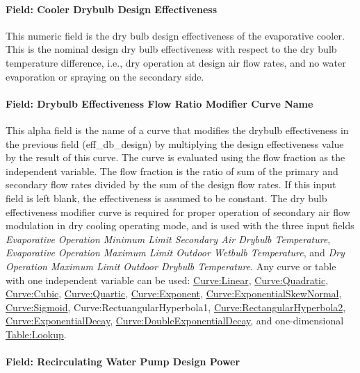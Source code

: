 \paragraph{Field: Cooler Drybulb Design Effectiveness}\label{field-cooler-drybulb-design-effectiveness}

This numeric field is the dry bulb design effectiveness of the evaporative cooler. This is the nominal design dry bulb effectiveness with respect to the dry bulb temperature difference, i.e., dry operation at design air flow rates, and no water evaporation or spraying on the secondary side.

\paragraph{Field: Drybulb Effectiveness Flow Ratio Modifier Curve Name}\label{field-drybulb-effectiveness-flow-ratio-modifier-curve-name}

This alpha field is the name of a curve that modifies the drybulb effectiveness in the previous field (eff\_db\_design) by multiplying the design effectiveness value by the result of this curve. The curve is evaluated using the flow fraction as the independent variable. The flow fraction is the ratio of sum of the primary and secondary flow rates divided by the sum of the design flow rates. If this input field is left blank, the effectiveness is assumed to be constant. The dry bulb effectiveness modifier curve is required for proper operation of secondary air flow modulation in dry cooling operating mode, and is used with the three input fields \textit{Evaporative Operation Minimum Limit Secondary Air Drybulb Temperature}, \textit{Evaporative Operation Maximum Limit Outdoor Wetbulb Temperature}, and \textit{Dry Operation Maximum Limit Outdoor Drybulb Temperature}. Any curve or table with one independent variable can be used: \hyperref[curvelinear]{Curve:Linear}, \hyperref[curvequadratic]{Curve:Quadratic}, \hyperref[curvecubic]{Curve:Cubic}, \hyperref[curvequartic]{Curve:Quartic}, \hyperref[curveexponent]{Curve:Exponent}, \hyperref[curveexponentialskewnormal]{Curve:ExponentialSkewNormal}, \hyperref[curvesigmoid]{Curve:Sigmoid}, Curve:RectuangularHyperbola1, \hyperref[curverectangularhyperbola2]{Curve:RectangularHyperbola2}, \hyperref[curveexponentialdecay]{Curve:ExponentialDecay}, \hyperref[curvedoubleexponentialdecay]{Curve:DoubleExponentialDecay}, and one-dimensional \hyperref[tablelookup]{Table:Lookup}.

\paragraph{Field: Recirculating Water Pump Design Power}\label{field-recirculating-water-pump-design-power}

